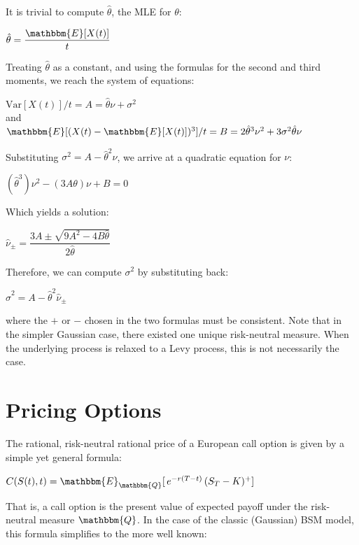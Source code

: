 \documentclass[twoside]{article}
\begin{document}
\begin{multicols}{2}
It is trivial to compute $\hat{\theta}$, the MLE for $\theta$:
\begin{center}{
$\hat{\theta} = \dfrac{\mathbbm{E}[X(t)]}{t}$
}\end{center}

Treating $\hat{\theta}$ as a constant, and using the formulas for the second and third moments, we reach the system of equations:

\begin{center}{
$\mathrm{Var}[X(t)]/t = A = \hat{\theta} \nu + \sigma^2$ \\
\vspace{2mm}
and \\
\vspace{2mm}
$\mathbbm{E}[(X(t)-\mathbbm{E}[X(t)])^3]/t = B = 2 \hat{\theta}^3 \nu^2 + 3 \sigma^2 \hat{\theta} \nu$
}\end{center}

Substituting $\sigma^2 = A - \hat{\theta}^2 \nu $, we arrive at a quadratic equation for $\nu$:
\begin{center}{
$(\hat{\theta}^3) \nu^2 - (3 A \theta) \nu + B = 0 $
}\end{center}

Which yields a solution:
\begin{center}{
$\hat{\nu}_\pm = \dfrac{3A \pm \sqrt{9A^2 - 4 B \hat{\theta}}}{2 \hat{\theta}}$
}\end{center}

Therefore, we can compute $\sigma^2$ by substituting back:
\begin{center}{
$\hat{\sigma}^2 = A - \hat{\theta}^2 \hat{\nu}_\pm $
}\end{center}

where the $+$ or $-$ chosen in the two formulas must be consistent. Note that in the simpler Gaussian case, there existed one unique risk-neutral measure. When the underlying process is relaxed to a Levy process, this is not necessarily the case.

\section{Pricing Options}
The rational, risk-neutral rational price of a European call option is given by a simple yet general formula:
\begin{center}
$C(S(t), t) = \mathbbm{E}_\mathbbm{Q}[\, e^{-r (T-t)} \, (S_T-K)^+]$
\end{center}

That is, a call option is the present value of expected payoff under the risk-neutral measure $\mathbbm{Q}$. In the case of the classic (Gaussian) BSM model, this formula simplifies to the more well known:


\end{multicols}
\end{document}
